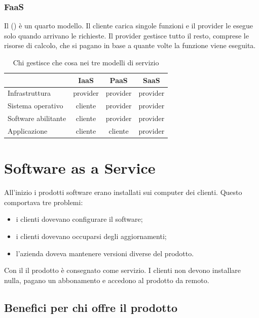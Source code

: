 \subsubsection{FaaS\aggiunta}
Il  () è un quarto modello. Il cliente carica singole funzioni e il provider
le esegue solo quando arrivano le richieste. Il provider gestisce tutto il resto, comprese le risorse di calcolo, che
si pagano in base a quante volte la funzione viene eseguita.

\begin{table}[ht]
\centering
\small
\caption{Chi gestisce che cosa nei tre modelli di servizio\aggiunta}
\label{tab:cloud-aas}
\begin{tabular}{@{}lccc@{}}
\toprule
& IaaS & PaaS & SaaS \\
\midrule
Infrastruttura & provider & provider & provider \\
Sistema operativo & cliente & provider & provider \\
Software abilitante & cliente & provider & provider \\
Applicazione & cliente & cliente & provider \\
\bottomrule
\end{tabular}
\end{table}

\section{Software as a Service}
\label{sec:cloud-saas}

All'inizio i prodotti software erano installati sui computer dei clienti. Questo comportava tre problemi:
\begin{itemize}
  \item i clienti dovevano configurare il software;
  \item i clienti dovevano occuparsi degli aggiornamenti;
  \item l'azienda doveva mantenere versioni diverse del prodotto.
\end{itemize}

Con il  il prodotto è consegnato come servizio. I clienti non devono installare nulla, pagano un abbonamento
e accedono al prodotto da remoto.

\subsection{Benefici per chi offre il prodotto}


